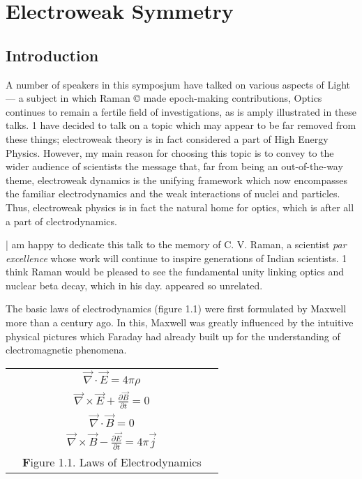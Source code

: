 \chapter[Electroweak Symmetry ]{Electroweak Symmetry}\label{chap28}


\renewcommand{\thefootnote}{\arabic{footnote}}

\section{Introduction}

A number of speakers in this symposjum have talked on various aspects of Light — a subject in
which Raman © made epoch-making contributions, Optics continues to remain a fertile field of
investigations, as is amply illustrated in these talks. 1 have decided to talk on a topic which may
appear to be far removed from these things; electroweak theory is in fact considered a part of
High Energy Physics. However, my main reason for choosing this topic is to convey to the wider
audience of scientists the message that, far from being an out-of-the-way theme, electroweak dynamics
is the unifying framework which now encompasses the familiar electrodynamics and the weak
interactions of nuclei and particles. Thus, electroweak physics is in fact the natural home for optics,
which is after all a part of clectrodynamics. 

| am happy to dedicate this talk to the memory of C. V. Raman, a scientist {\it par excellence} whose
work will continue to inspire generations of Indian scientists. 1 think Raman would be pleased to
see the fundamental unity linking optics and nuclear beta decay, which in his day. appeared so unrelated. 

The basic laws of electrodynamics (figure 1.1) were first formulated by Maxwell more than a
century ago. In this, Maxwell was greatly influenced by the intuitive physical pictures which Faraday
had already built up for the understanding of clectromagnetic phenomena. 
\begin{center}
\begin{tabular}{ccc}
& $\vec{\nabla} \cdot \vec{E} = 4 \pi \rho$ &\\[.2cm]
& $\vec{\nabla} \times \vec{E} + \frac{\partial \vec{B}}{\partial t} = 0$\\[.2cm]
& $\vec{\nabla} \cdot \vec{B} = 0$&\\[.2cm]
& $\vec{\nabla} \times \vec{B}- \frac{\partial \vec{E}}{\partial t} = 4 \pi \vec{j}$&\\[.2cm]
& {\textbf Figure 1.1.} Laws of Electrodynamics&\\[.2cm]
\end{tabular}
\end{center}


